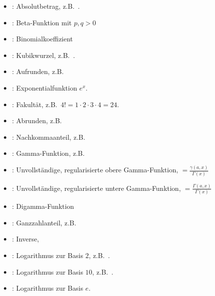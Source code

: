 \begin{itemize}

\item
{}:
Absolutbetrag, z.B.\ .

\item
{}:
Beta-Funktion mit $p,q>0$

\item
{}:
Binomialkoeffizient

\item
{}:
Kubikwurzel, z.B.\ .

\item
{}:
Aufrunden, z.B.\ 

\item
{}:
Exponentialfunktion $e^x$.

\item
{}:
Fakultät, z.B.\ $4!=1\cdot2\cdot3\cdot4=24$.

\item
{}:
Abrunden, z.B.\ 

\item
{}:
Nachkommaanteil, z.B.\ 

\item
{}:
Gamma-Funktion, z.B.\ 

\item
{}:
Unvollständige, regularisierte obere Gamma-Funktion, $=\frac{\gamma(a,x)}{\Gamma(x)}$
\item

:
Unvollständige, regularisierte untere Gamma-Funktion, $=\frac{\Gamma(a,x)}{\Gamma(x)}$

\item
{}:
Digamma-Funktion

\item
{}:
Ganzzahlanteil, z.B.\ 

\item
{}:
Inverse, 

\item
{}:
Logarithmus zur Basis $2$, z.B.\ .

\item
{}:
Logarithmus zur Basis $10$, z.B.\ .

\item
{}:
Logarithmus zur Basis $e$.


\end{itemize}
